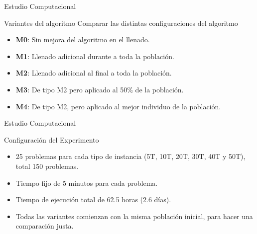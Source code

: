 \documentclass[handout]{beamer}
\begin{document}
\begin{frame}{Estudio Computacional}
    \begin{exampleblock}{Variantes del algoritmo}
        Comparar las distintas configuraciones del algoritmo
        \begin{itemize}[<+-| alert@+>]
            \item \textbf{M0}: Sin mejora del algoritmo en el llenado.
            \item \textbf{M1}: Llenado adicional durante a toda la población.
            \item \textbf{M2}: Llenado adicional al final a toda la población.
            \item \textbf{M3}: De tipo M2 pero aplicado al 50\% de la población.
            \item \textbf{M4}: De tipo M2, pero aplicado al mejor individuo de la población.
        \end{itemize}
    \end{exampleblock}
\end{frame}

\begin{frame}{Estudio Computacional}
    \begin{exampleblock}{Configuración del Experimento}
        \begin{itemize}[<+-| alert@+>]
            \item 25 problemas para cada tipo de instancia (5T, 10T, 20T, 30T, 40T y 50T), total 150 problemas.
            \item Tiempo fijo de 5 minutos para cada problema.
            \item Tiempo de ejecución total de 62.5 horas (2.6 días).
            \item Todas las variantes comienzan con la misma población inicial, para hacer una comparación justa.
        \end{itemize}
    \end{exampleblock}
\end{frame}
\end{document}
